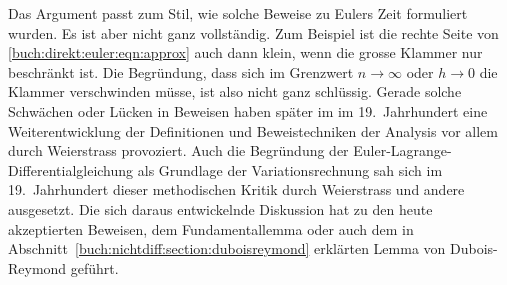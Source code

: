 Das Argument passt zum Stil, wie solche Beweise zu Eulers Zeit 
formuliert wurden.
Es ist aber nicht ganz vollständig.
Zum Beispiel ist die rechte Seite von \eqref{buch:direkt:euler:eqn:approx}
auch dann klein, wenn die grosse Klammer nur beschränkt ist.
Die Begründung, dass sich im Grenzwert $n\to\infty$ oder $h\to 0$ die
Klammer verschwinden müsse, ist also nicht ganz schlüssig.
Gerade solche Schwächen oder Lücken in Beweisen haben später im
im 19.~Jahrhundert eine Weiterentwicklung der Definitionen und
Beweistechniken der Analysis vor allem durch Weierstrass provoziert.
Auch die Begründung der Euler-Lagrange-Differentialgleichung als Grundlage
der Variationsrechnung sah sich im 19.~Jahrhundert dieser methodischen
Kritik durch Weierstrass und andere ausgesetzt.
Die sich daraus entwickelnde Diskussion hat zu den heute akzeptierten
Beweisen, dem Fundamentallemma oder auch dem in 
Abschnitt~\ref{buch:nichtdiff:section:duboisreymond} 
erklärten Lemma von Dubois-Reymond geführt.


